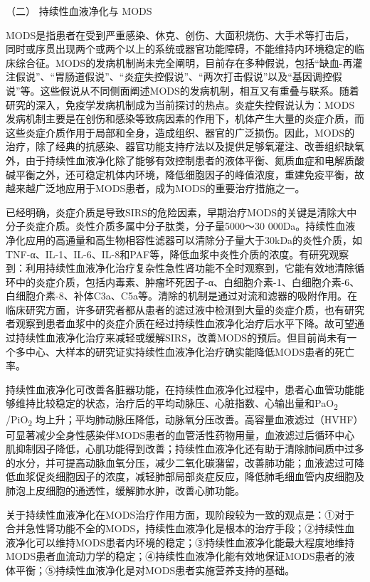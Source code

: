 \hypertarget{text00391.htmlux5cux23CHP16-10-2-2-2}{}
（二） 持续性血液净化与 MODS

MODS是指患者在受到严重感染、休克、创伤、大面积烧伤、大手术等打击后，同时或序贯出现两个或两个以上的系统或器官功能障碍，不能维持内环境稳定的临床综合征。MODS的发病机制尚未完全阐明，目前存在多种假说，包括“缺血-再灌注假说”、“胃肠道假说”、“炎症失控假说”、“两次打击假说”以及“基因调控假说”等。这些假说从不同侧面阐述MODS的发病机制，相互又有重叠与联系。随着研究的深入，免疫学发病机制成为当前探讨的热点。炎症失控假说认为：MODS发病机制主要是在创伤和感染等致病因素的作用下，机体产生大量的炎症介质，而这些炎症介质作用于局部和全身，造成组织、器官的广泛损伤。因此，MODS的治疗，除了经典的抗感染、器官功能支持疗法以及提供足够氧灌注、改善组织缺氧外，由于持续性血液净化除了能够有效控制患者的液体平衡、氮质血症和电解质酸碱平衡之外，还可稳定机体内环境，降低细胞因子的峰值浓度，重建免疫平衡，故越来越广泛地应用于MODS患者，成为MODS的重要治疗措施之一。

已经明确，炎症介质是导致SIRS的危险因素，早期治疗MODS的关键是清除大中分子炎症介质。炎性介质多属中分子肽类，分子量5000～30
000Da。持续性血液净化应用的高通量和高生物相容性滤器可以清除分子量大于30kDa的炎性介质，如TNF-α、IL-1、IL-6、IL-8和PAF等，降低血浆中炎性介质的浓度。有研究观察到：利用持续性血液净化治疗复杂性急性肾功能不全时观察到，它能有效地清除循环中的炎症介质，包括内毒素、肿瘤坏死因子-α、白细胞介素-1、白细胞介素-6、白细胞介素-8、补体C3a、C5a等。清除的机制是通过对流和滤器的吸附作用。在临床研究方面，许多研究者都从患者的滤过液中检测到大量的炎症介质，也有研究者观察到患者血浆中的炎症介质在经过持续性血液净化治疗后水平下降。故可望通过持续性血液净化治疗来减轻或缓解SIRS，改善MODS的预后。但目前尚未有一个多中心、大样本的研究证实持续性血液净化治疗确实能降低MODS患者的死亡率。

持续性血液净化可改善各脏器功能，在持续性血液净化过程中，患者心血管功能能够维持比较稳定的状态，治疗后的平均动脉压、心脏指数、心输出量和PaO\textsubscript{2}
/PiO\textsubscript{2}
均上升；平均肺动脉压降低，动脉氧分压改善。高容量血液滤过（HVHF）可显著减少全身性感染伴MODS患者的血管活性药物用量，血液滤过后循环中心肌抑制因子降低，心肌功能得到改善；持续性血液净化还有助于清除肺间质中过多的水分，并可提高动脉血氧分压，减少二氧化碳潴留，改善肺功能；血液滤过可降低血浆促炎细胞因子的浓度，减轻肺部局部炎症反应，降低肺毛细血管内皮细胞及肺泡上皮细胞的通透性，缓解肺水肿，改善心肺功能。

关于持续性血液净化在MODS治疗作用方面，现阶段较为一致的观点是：①对于合并急性肾功能不全的MODS，持续性血液净化是根本的治疗手段；②持续性血液净化可以维持MODS患者内环境的稳定；③持续性血液净化能最大程度地维持MODS患者血流动力学的稳定；④持续性血液净化能有效地保证MODS患者的液体平衡；⑤持续性血液净化是对MODS患者实施营养支持的基础。


